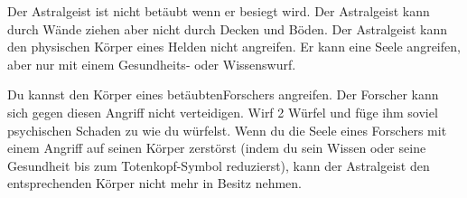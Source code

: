   \begin{itemize}
    \bitem Der Astralgeist ist nicht betäubt wenn er besiegt wird.
    \bitem Der Astralgeist kann durch Wände ziehen aber nicht durch Decken und Böden.
    \bitem Der Astralgeist kann den physischen Körper eines Helden nicht angreifen. Er kann eine Seele angreifen, aber nur mit einem Gesundheits- oder Wissenswurf.
    \end{itemize}


  \begin{itemize}
    \bitem Du kannst den Körper eines betäubtenForschers angreifen. Der Forscher kann sich gegen diesen Angriff nicht verteidigen. Wirf 2 Würfel und füge ihm soviel psychischen Schaden zu wie du würfelst.
    \bitem Wenn du die Seele eines Forschers mit einem Angriff auf seinen Körper zerstörst (indem du sein Wissen oder seine Gesundheit bis zum Totenkopf-Symbol reduzierst), kann der Astralgeist den entsprechenden Körper nicht mehr in Besitz nehmen.
    \end{itemize}



